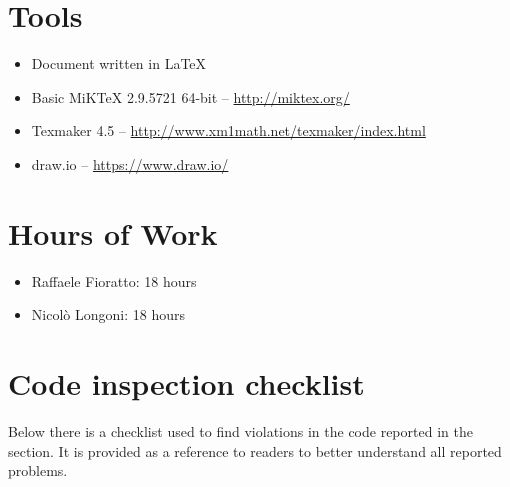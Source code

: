 \newpage
\begin{appendices}
\section{Tools}
\begin{itemize}
	\item Document written in \LaTeX
	\item Basic MiKTeX 2.9.5721 64-bit -- \url{http://miktex.org/}
	\item Texmaker 4.5 -- \url{http://www.xm1math.net/texmaker/index.html}
	\item draw.io -- \url{https://www.draw.io/}
\end{itemize}
\break
\section{Hours of Work}
\begin{itemize}
	\item Raffaele Fioratto: 18 hours
	\item Nicol\`{o} Longoni: 18 hours
\end{itemize}
\break
\section{Code inspection checklist}
Below there is a checklist used to find violations in the code reported in the  section. It is provided as a reference to readers to better understand all reported problems.

\end{appendices}